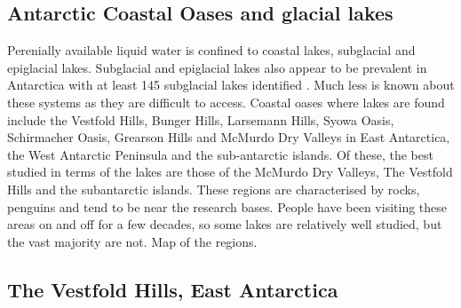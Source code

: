 \documentclass{book}
\begin{document}
\subsection{Antarctic Coastal Oases and glacial lakes}

Perenially available liquid water is confined to coastal lakes, subglacial and epiglacial lakes.
Subglacial and epiglacial lakes also appear to be prevalent in Antarctica with at least 145 subglacial lakes identified \cite{Siegert2005}.%
Much less is known about these systems as they are difficult to access.
Coastal oases where lakes are found include the Vestfold Hills, Bunger Hills, Larsemann Hills, Syowa Oasis, Schirmacher Oasis, Grearson Hills and McMurdo Dry Valleys in East Antarctica, the West Antarctic Peninsula and the sub-antarctic islands.
Of these, the best studied in terms of the lakes are those of the McMurdo Dry Valleys, The Vestfold Hills and the subantarctic islands.
These regions are characterised by rocks, penguins and tend to be near the research bases.
People have been visiting these areas on and off for a few decades, so some lakes are relatively well studied, but the vast majority are not. 
Map of the regions.

\subsection{The Vestfold Hills, East Antarctica}
\end{document}
